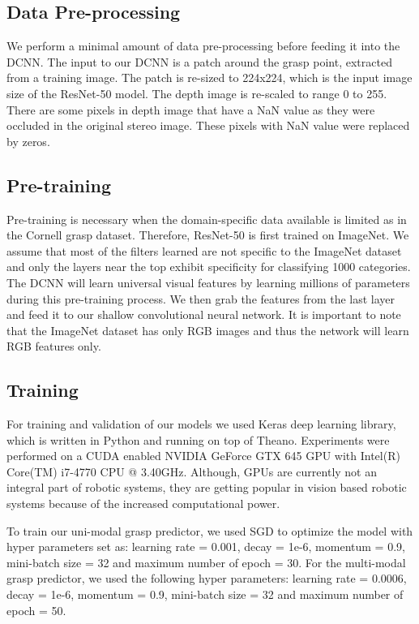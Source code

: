 \documentclass[10pt,twocolumn,letterpaper]{article}
\begin{document}
\subsection{Data Pre-processing}
We perform a minimal amount of data pre-processing before feeding it into the DCNN. The input to our DCNN is a patch around the grasp point, extracted from a training image. The patch is re-sized to 224x224, which is the input image size of the  ResNet-50 model. The depth image is re-scaled to range 0 to 255. There are some pixels in depth image that have a NaN value as they were occluded in the original stereo image. These pixels with NaN value were replaced by zeros.

\subsection{Pre-training}
Pre-training is necessary when the domain-specific data available is limited as in the Cornell grasp dataset. Therefore, ResNet-50 is first trained on ImageNet. We assume that most of the filters learned are not specific to the ImageNet dataset and only the layers near the top exhibit specificity for classifying 1000 categories. The DCNN will learn universal visual features by learning millions of parameters during this pre-training process. We then grab the features from the last layer and feed it to our shallow convolutional neural network. It is important to note that the ImageNet dataset has only RGB images and thus the network will learn RGB features only.

\subsection{Training}
For training and validation of our models we used Keras deep learning library, which is written in Python and running on top of Theano. Experiments were performed on a CUDA enabled NVIDIA GeForce GTX 645 GPU with Intel(R) Core(TM) i7-4770 CPU @ 3.40GHz. Although, GPUs are currently not an integral part of robotic systems, they are getting popular in vision based robotic systems because of the increased computational power.

To train our uni-modal grasp predictor, we used SGD to optimize the model with hyper parameters set as: learning rate = 0.001, decay = 1e-6, momentum = 0.9, mini-batch size = 32 and maximum number of epoch = 30. For the multi-modal grasp predictor, we used the following hyper parameters: learning rate = 0.0006, decay = 1e-6, momentum = 0.9, mini-batch size = 32 and maximum number of epoch = 50.
\end{document}
